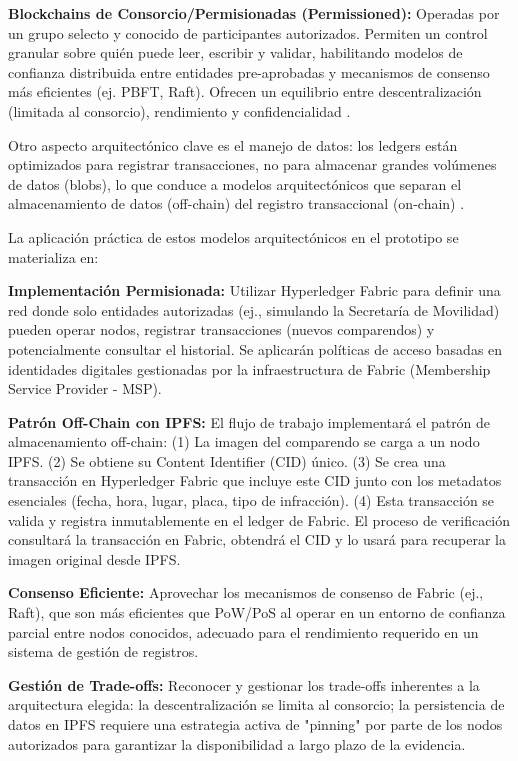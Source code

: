 \textbf{Blockchains de Consorcio/Permisionadas (Permissioned):} Operadas por un grupo selecto y conocido de participantes autorizados. Permiten un control granular sobre quién puede leer, escribir y validar, habilitando modelos de confianza distribuida entre entidades pre-aprobadas y mecanismos de consenso más eficientes (ej. PBFT, Raft). Ofrecen un equilibrio entre descentralización (limitada al consorcio), rendimiento y confidencialidad \parencite{vukolic2015quest,cachin2018architecture}.

Otro aspecto arquitectónico clave es el manejo de datos: los ledgers están optimizados para registrar transacciones, no para almacenar grandes volúmenes de datos (blobs), lo que conduce a modelos arquitectónicos que separan el almacenamiento de datos (off-chain) del registro transaccional (on-chain) \parencite{xu2019taxonomy}. 

La aplicación práctica de estos modelos arquitectónicos en el prototipo se materializa en: 

\textbf{Implementación Permisionada: }Utilizar Hyperledger Fabric para definir una red donde solo entidades autorizadas (ej., simulando la Secretaría de Movilidad) pueden operar nodos, registrar transacciones (nuevos comparendos) y potencialmente consultar el historial. Se aplicarán políticas de acceso basadas en identidades digitales gestionadas por la infraestructura de Fabric (Membership Service Provider - MSP). 

\textbf{Patrón Off-Chain con IPFS: } El flujo de trabajo implementará el patrón de almacenamiento off-chain: (1) La imagen del comparendo se carga a un nodo IPFS. (2) Se obtiene su Content Identifier (CID) único. (3) Se crea una transacción en Hyperledger Fabric que incluye este CID junto con los metadatos esenciales (fecha, hora, lugar, placa, tipo de infracción). (4) Esta transacción se valida y registra inmutablemente en el ledger de Fabric. El proceso de verificación consultará la transacción en Fabric, obtendrá el CID y lo usará para recuperar la imagen original desde IPFS. 

\textbf{Consenso Eficiente:} Aprovechar los mecanismos de consenso de Fabric (ej., Raft), que son más eficientes que PoW/PoS al operar en un entorno de confianza parcial entre nodos conocidos, adecuado para el rendimiento requerido en un sistema de gestión de registros. 

\textbf{Gestión de Trade-offs:} Reconocer y gestionar los trade-offs inherentes a la arquitectura elegida: la descentralización se limita al consorcio; la persistencia de datos en IPFS requiere una estrategia activa de "pinning" por parte de los nodos autorizados para garantizar la disponibilidad a largo plazo de la evidencia. 
